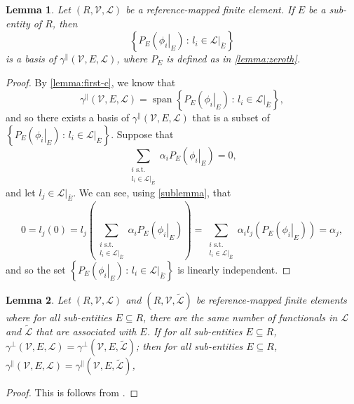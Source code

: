\documentclass[sn-mathphys-num]{sn-jnl}%
\theoremstyle{thmstyleone}%
\newtheorem{lemma}{Lemma}%
\newcommand{\closure}[1]{\overline{#1}}
\newcommand{\subentity}{E}
\newcommand{\refel}{R}
\newcommand{\polyspace}{\mathcal{V}}
\newcommand{\dualbasis}{\mathcal{L}}
\newcommand{\unctrace}[3]{\gamma^\perp(#1,#2,#3)}
\newcommand{\ctrace}[3]{\gamma^\parallel(#1,#2,#3)}
\theoremstyle{thmstyletwo}%
\theoremstyle{thmstylethree}%
\begin{document}
\begin{lemma}\label{lemma:first-basis}
Let $(\refel,\polyspace,\dualbasis)$ be a reference-mapped finite element.
If $\subentity$ be a sub-entity of $\refel$, then
\[\left\{P_{\subentity}\left(\left.\phi_i\right|_{\subentity}\right)
\,:\,l_i\in\left.\dualbasis\right|_{\closure{\subentity}}\right\}\]
is a basis of $\ctrace{\polyspace}{\subentity}{\dualbasis}$, where $P_{\subentity}$ is defined as in \cref{lemma:zeroth}.
\end{lemma}
\begin{proof}
By \cref{lemma:first-c}, we know that
\[
\ctrace{\polyspace}{\subentity}{\dualbasis} =
\operatorname{span}\left\{P_{\subentity}\left(\left.\phi_i\right|_{\subentity}\right)
\,:\,l_i\in\left.\dualbasis\right|_{\closure{\subentity}}\right\},
\]
and so there exists a basis of $\ctrace{\polyspace}{\subentity}{\dualbasis}$ that is a subset of
$\left\{P_{\subentity}\left(\left.\phi_i\right|_{\subentity}\right)
\,:\,l_i\in\left.\dualbasis\right|_{\closure{\subentity}}\right\}$.
Suppose that
\[\sum_{\substack{i\text{ s.t.}\\l_i\in\left.\dualbasis\right|_{\closure{\subentity}}}}\alpha_iP_{\subentity}\left(\left.\phi_i\right|_{\subentity}\right) = 0,\]
and let
$l_j\in\left.\dualbasis\right|_{\closure{\subentity}}$. We can see, using \cref{sublemma}, that
\[
0 = l_j(0)
=
l_j\left(\sum_{\substack{i\text{ s.t.}\\l_i\in\left.\dualbasis\right|_{\closure{\subentity}}}}\alpha_iP_{\subentity}\left(\left.\phi_i\right|_{\subentity}\right)\right)
=
\sum_{\substack{i\text{ s.t.}\\l_i\in\left.\dualbasis\right|_{\closure{\subentity}}}}\alpha_il_j\left(P_{\subentity}\left(\left.\phi_i\right|_{\subentity}\right)\right)
=
\alpha_j,
\]
and so the set 
$\left\{P_{\subentity}\left(\left.\phi_i\right|_{\subentity}\right)
\,:\,l_i\in\left.\dualbasis\right|_{\closure{\subentity}}\right\}$
is linearly independent.
\end{proof}

\begin{lemma}\label{lemma:second}
Let $(\refel,\polyspace,\dualbasis)$ and $(\refel,\polyspace,\tilde{\dualbasis})$ be reference-mapped finite elements
where for all sub-entities $\subentity\subseteq\refel$, there are the same number of functionals in $\dualbasis$ and $\tilde{\dualbasis}$ that are associated with $\subentity$.
If
for all sub-entities $\subentity\subseteq\refel$,
$\unctrace{\polyspace}{\subentity}{\dualbasis} = \unctrace{\polyspace}{\subentity}{\tilde{\dualbasis}}$;
then 
for all sub-entities $\subentity\subseteq\refel$,
$\ctrace{\polyspace}{\subentity}{\dualbasis} = \ctrace{\polyspace}{\subentity}{\tilde{\dualbasis}}$,
\end{lemma}
\begin{proof}
This is follows from \cite[theorem 3.3-4]{kreyszig}.
\end{proof}
\end{document}
